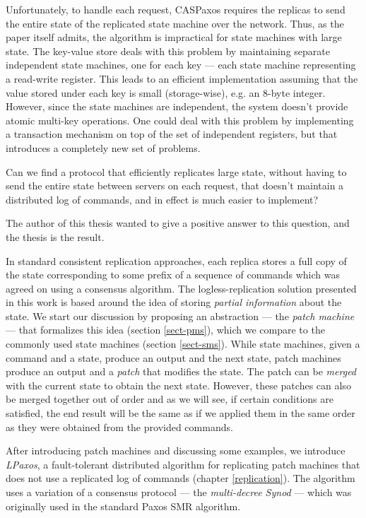 \documentclass[12pt,a4paper,en]{pracamgr}
\newcommand{\ti}[1]{\textit{#1}}
\begin{document}
Unfortunately, to handle each request, CASPaxos requires the replicas to send the entire state of the replicated state machine over the network. Thus, as the paper itself admits, the algorithm is impractical for state machines with large state. The key-value store deals with this problem by maintaining separate independent state machines, one for each key --- each state machine representing a read-write register. This leads to an efficient implementation assuming that the value stored under each key is small (storage-wise), e.g. an 8-byte integer. However, since the state machines are independent, the system doesn't provide atomic multi-key operations. One could deal with this problem by implementing a transaction mechanism on top of the set of independent registers, but that introduces a completely new set of problems.

Can we find a protocol that efficiently replicates large state, without having to send the entire state between servers on each request, that doesn't maintain a distributed log of commands, and in effect is much easier to implement?

The author of this thesis wanted to give a positive answer to this question, and the thesis is the result.

In standard consistent replication approaches, each replica stores a full copy of the state corresponding to some prefix of a sequence of commands which was agreed on using a consensus algorithm. The logless-replication solution presented in this work is based around the idea of storing \ti{partial information} about the state. We start our discussion by proposing an abstraction --- the \ti{patch machine} --- that formalizes this idea (section \ref{sect-pms}), which we compare to the commonly used state machines (section \ref{sect-sms}). While state machines, given a command and a state, produce an output and the next state, patch machines produce an output and a \ti{patch} that modifies the state. The patch can be \ti{merged} with the current state to obtain the next state. However, these patches can also be merged together out of order and as we will see, if certain conditions are satisfied, the end result will be the same as if we applied them in the same order as they were obtained from the provided commands.

After introducing patch machines and discussing some examples, we introduce \ti{LPaxos}, a fault-tolerant distributed algorithm for replicating patch machines that does not use a replicated log of commands (chapter \ref{replication}). The algorithm uses a variation of a consensus protocol --- the \ti{multi-decree Synod} --- which was originally used in the standard Paxos SMR algorithm.
\end{document}
